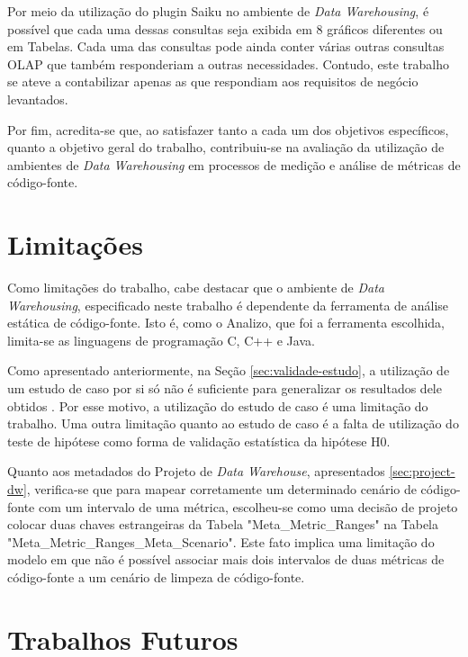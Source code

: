 Por meio da utilização do plugin Saiku no ambiente de \textit{Data Warehousing}, é possível que cada uma dessas consultas seja exibida em 8 gráficos diferentes ou em Tabelas. Cada uma das consultas pode ainda conter várias outras consultas OLAP que também responderiam a outras necessidades. Contudo, este trabalho se ateve a contabilizar apenas as que respondiam aos requisitos de negócio levantados.

Por fim, acredita-se que, ao satisfazer tanto a cada um dos objetivos específicos, quanto a objetivo geral do trabalho, contribuiu-se na avaliação da utilização de ambientes de \textit{Data Warehousing} em processos de medição e análise de métricas de código-fonte. 

\section{Limitações}

Como limitações do trabalho, cabe destacar que o ambiente de \textit{Data Warehousing}, especificado neste trabalho é dependente da ferramenta de análise estática de código-fonte. Isto é, como o Analizo, que foi a ferramenta escolhida, limita-se as linguagens de programação C, C++ e Java.

Como apresentado anteriormente, na Seção \ref{sec:validade-estudo}, a utilização de um estudo de caso por si só não é suficiente para generalizar os resultados dele obtidos \cite{yin2011applications}. Por esse motivo, a utilização do estudo de caso é uma limitação do trabalho. Uma outra limitação quanto ao estudo de caso é a falta de utilização do teste de hipótese como forma de validação estatística da hipótese H0.

Quanto aos metadados do Projeto de \textit{Data Warehouse}, apresentados \ref{sec:project-dw}, verifica-se que para mapear corretamente um determinado cenário de código-fonte com um intervalo de uma métrica, escolheu-se como uma decisão de projeto colocar duas chaves estrangeiras da Tabela "Meta\_Metric\_Ranges" na Tabela "Meta\_Metric\_Ranges\_Meta\_Scenario". Este fato implica uma limitação do modelo em que não é possível associar mais dois intervalos de duas métricas de código-fonte a um cenário de limpeza de código-fonte.  


\section{Trabalhos Futuros}


